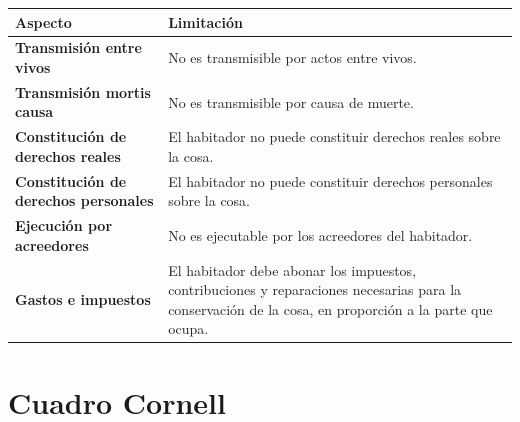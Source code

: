 \documentclass[12pt,oneside]{book}
\begin{document}
\begin{table}[H]
\centering
\begin{tabularx}{\textwidth}{
    >{\raggedright\arraybackslash}p{}
    >{\raggedright\arraybackslash}X
}
\toprule
\textbf{Aspecto} & \textbf{Limitación} \\
\midrule
\textbf{Transmisión entre vivos} & No es transmisible por actos entre vivos. \\
\textbf{Transmisión mortis causa} & No es transmisible por causa de muerte. \\
\textbf{Constitución de derechos reales} & El habitador no puede constituir derechos reales sobre la cosa. \\
\textbf{Constitución de derechos personales} & El habitador no puede constituir derechos personales sobre la cosa. \\
\textbf{Ejecución por acreedores} & No es ejecutable por los acreedores del habitador. \\
\textbf{Gastos e impuestos} & El habitador debe abonar los impuestos, contribuciones y reparaciones necesarias para la conservación de la cosa, en proporción a la parte que ocupa. \\
\bottomrule
\end{tabularx}
\end{table}

\section{Cuadro Cornell}
\end{document}
